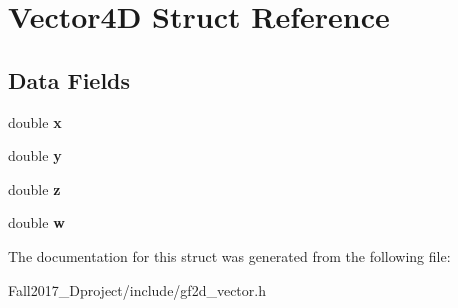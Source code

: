 \hypertarget{struct_vector4_d}{}\section{Vector4D Struct Reference}
\label{struct_vector4_d}
\subsection*{Data Fields}
\begin{DoxyCompactItemize}
\item 
\mbox{\label{struct_vector4_d_af88b946fb90d5f08b5fb740c70e98c10}} 
double {\bfseries x}
\item 
\mbox{\label{struct_vector4_d_ab927965981178aa1fba979a37168db2a}} 
double {\bfseries y}
\item 
\mbox{\label{struct_vector4_d_ab3e6ed577a7c669c19de1f9c1b46c872}} 
double {\bfseries z}
\item 
\mbox{\label{struct_vector4_d_afb3248bab1c7ee0ad97e9d4c275b4c67}} 
double {\bfseries w}
\end{DoxyCompactItemize}


The documentation for this struct was generated from the following file\+:\begin{DoxyCompactItemize}
\item 
Fall2017\+\_\+Dproject/include/gf2d\+\_\+vector.\+h\end{DoxyCompactItemize}
